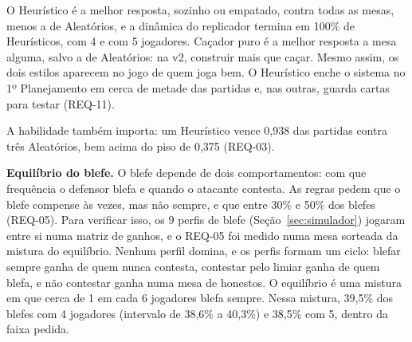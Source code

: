 O Heurístico é a melhor resposta, sozinho ou empatado, contra todas as mesas, menos a de Aleatórios, e a dinâmica
do replicador termina em 100\% de Heurísticos, com 4 e com 5 jogadores.  Caçador
puro é a melhor resposta a mesa alguma,
salvo a de Aleatórios: na v2, construir  mais que caçar. Mesmo assim, os dois estilos aparecem no
jogo de quem joga bem. O Heurístico enche o sistema no 1º Planejamento em cerca de metade das partidas e, nas
outras, guarda cartas para testar (REQ-11).


A habilidade também importa: um Heurístico vence 0,938 das partidas contra três
Aleatórios, bem acima do piso de 0,375 (REQ-03). 

\textbf{Equilíbrio do blefe.} O blefe depende de dois comportamentos: com que frequência o defensor blefa e quando
o atacante contesta. As regras pedem que o blefe compense às vezes, mas não sempre, e que entre 30\% e 50\% dos
blefes  (REQ-05). Para verificar isso, os 9 perfis de blefe (Seção~\ref{sec:simulador}) jogaram entre si
numa matriz de ganhos, e o REQ-05 foi medido numa mesa sorteada da mistura do equilíbrio.
Nenhum perfil domina, e os perfis formam um ciclo: blefar sempre ganha de quem nunca contesta, contestar pelo
limiar ganha de quem blefa, e não contestar ganha numa mesa de honestos. O equilíbrio é uma mistura em que cerca
de 1 em cada 6 jogadores blefa sempre. Nessa mistura, 39,5\% dos blefes  com 4
jogadores (intervalo de
38,6\% a 40,3\%) e 38,5\% com 5, dentro da faixa pedida.

